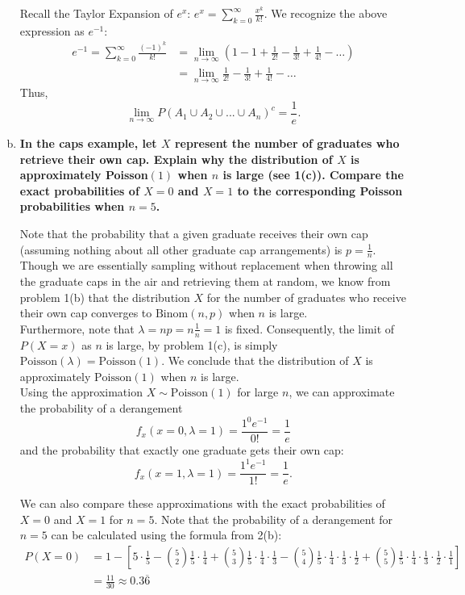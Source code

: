 \begin{enumerate}[a)]
    Recall the Taylor Expansion of $e^{x}$: $e^{x} = \sum\limits^{\infty}_{k=0} \frac{x^{k}}{k!}.$ 
    We recognize the above expression as $e^{-1}$: 
    \begin{align*}
        e^{-1} = \sum\limits^{\infty}_{k=0} \frac{(-1)^{k}}{k!} &= \lim\limits_{n \to \infty} \left(1-1 + \frac{1}{2!} - \frac{1}{3!} + \frac{1}{4!} - \dots \right) \\
        &= \lim\limits_{n \to \infty} \frac{1}{2!} -\frac{1}{3!} + \frac{1}{4!} - \dots 
    \end{align*}
    Thus,
    \[ 
        \lim\limits_{n \to \infty} P(A_{1} \cup A_{2} \cup . . . \cup A_{n})^{c} = \boxed{\frac{1}{e}}.
    \]
        
    \item \textbf{In the caps example, let $X$ represent the number of graduates who retrieve their own cap. Explain why the distribution of $X$ is approximately
    Poisson$(1)$ when $n$ is large (see 1(c)). Compare the exact probabilities of $X = 0$ and $X=1$ to the corresponding Poisson probabilities when $n=5$.}

    Note that the probability that a given graduate receives their own cap (assuming nothing about all other graduate cap arrangements) is $p = \frac{1}{n}$. Though we are essentially sampling without replacement when throwing all the graduate caps in the air and retrieving them at random, we know from problem 1(b) that the distribution $X$ for the number of graduates who receive their own cap converges to $\mathrm{Binom}(n, p)$ when $n$ is large. \\

    Furthermore, note that $\lambda = np = n\frac{1}{n} = 1$ is fixed. Consequently, the limit of $P(X = x)$ as $n$ is large, by problem 1(c), is simply $\mathrm{Poisson}(\lambda) = \mathrm{Poisson}(1)$. We conclude that the distribution of $X$ is approximately $\mathrm{Poisson}(1)$ when $n$ is large. \\

    Using the approximation $X \sim \mathrm{Poisson}(1)$ for large $n$, we can approximate the probability of a derangement
    \[ 
        f_x(x=0, \lambda = 1) = \frac{1^0 e^{-1}}{0!} = \frac{1}{e}
    \]
    and the probability that exactly one graduate gets their own cap:
    \[ 
        f_x(x=1, \lambda = 1) = \frac{1^1 e^{-1}}{1!} = \frac{1}{e}.
    \]

    We can also compare these approximations with the exact probabilities of $X=0$ and $X=1$ for $n=5$. Note that the probability of a derangement for $n=5$ can be calculated using the formula from 2(b):
    \begin{align*}
        P(X = 0)&= 1 - \left[ 5 \cdot \frac{1}{5} - \binom{5}{2}\frac{1}{5} \cdot \frac{1}{4} + 
        \binom{5}{3}\frac{1}{5} \cdot \frac{1}{4} \cdot \frac{1}{3} - \binom{5}{4}\frac{1}{5} \cdot \frac{1}{4} \cdot \frac{1}{3} \cdot \frac{1}{2}
        + \binom{5}{5}\frac{1}{5} \cdot \frac{1}{4} \cdot \frac{1}{3} \cdot \frac{1}{2} \cdot \frac{1}{1}\right] \\
        &= \frac{11}{30} \approx 0.3\overline{6}
    \end{align*}


\end{enumerate}
